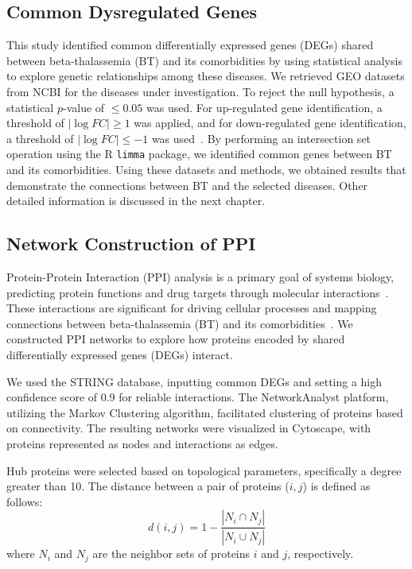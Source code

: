\vspace*{-\parskip}
\subsection{Common Dysregulated Genes}
\label{sec:common_degs}

This study identified common differentially expressed genes (DEGs) shared between beta-thalassemia (BT) and its comorbidities by using statistical analysis to explore genetic relationships among these diseases. We retrieved GEO datasets from NCBI for the diseases under investigation. To reject the null hypothesis, a statistical \( p \)-value of \( \leq 0.05 \) was used. For up-regulated gene identification, a threshold of \( |\log FC| \geq 1 \) was applied, and for down-regulated gene identification, a threshold of \( |\log FC| \leq -1 \) was used~\cite{common_deg_ref}. By performing an intersection set operation using the R \texttt{limma} package, we identified common genes between BT and its comorbidities. Using these datasets and methods, we obtained results that demonstrate the connections between BT and the selected diseases. Other detailed information is discussed in the next chapter.

\vspace*{-\parskip}
\subsection{Network Construction of PPI}
\label{sec:ppi_network}

Protein-Protein Interaction (PPI) analysis is a primary goal of systems biology, predicting protein functions and drug targets through molecular interactions~\cite{ppi_ref1}. These interactions are significant for driving cellular processes and mapping connections between beta-thalassemia (BT) and its comorbidities~\cite{ppi_ref2}. We constructed PPI networks to explore how proteins encoded by shared differentially expressed genes (DEGs) interact.

We used the STRING database, inputting common DEGs and setting a high confidence score of 0.9 for reliable interactions. The NetworkAnalyst platform, utilizing the Markov Clustering algorithm, facilitated clustering of proteins based on connectivity. The resulting networks were visualized in Cytoscape, with proteins represented as nodes and interactions as edges.

Hub proteins were selected based on topological parameters, specifically a degree greater than 10. The distance between a pair of proteins (\( i, j \)) is defined as follows:
\begin{equation}
d(i,j) = 1 - \frac{|N_i \cap N_j|}{|N_i \cup N_j|}
\label{eq:protein_distance}
\end{equation}
where \( N_i \) and \( N_j \) are the neighbor sets of proteins \( i \) and \( j \), respectively.

